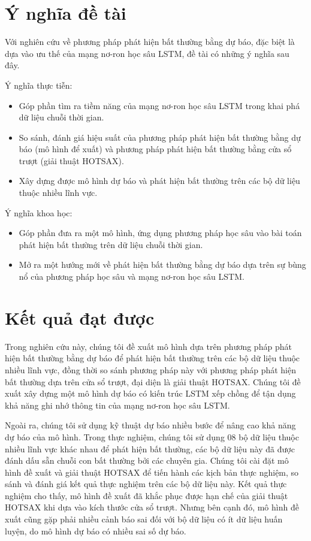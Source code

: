 \section{Ý nghĩa đề tài}
Với nghiên cứu về phương pháp phát hiện bất thường bằng dự báo, đặc biệt là dựa vào ưu thế của mạng nơ-ron học sâu LSTM, đề tài có những ý nghĩa sau đây.

Ý nghĩa thực tiễn:
\begin{itemize}
\item Góp phần tìm ra tiềm năng của mạng nơ-ron học sâu LSTM trong khai phá dữ liệu chuỗi thời gian.
\item So sánh, đánh giá hiệu suất của phương pháp phát hiện bất thường bằng dự báo (mô hình để xuất) và phương pháp phát hiện bất thường bằng cửa sổ trượt (giải thuật HOTSAX).
\item Xây dựng được mô hình dự báo và phát hiện bất thường trên các bộ dữ liệu thuộc nhiều lĩnh vực.
\end{itemize}

Ý nghĩa khoa học:
\begin{itemize}
\item Góp phần đưa ra một mô hình, ứng dụng phương pháp học sâu vào bài toán phát hiện bất thường trên dữ liệu chuỗi thời gian.
\item Mở ra một hướng mới về phát hiện bất thường bằng dự báo dựa trên sự bùng nổ của phương pháp học sâu và mạng nơ-ron học sâu LSTM.
\end{itemize}

\section{Kết quả đạt được}
Trong nghiên cứu này, chúng tôi đề xuất mô hình dựa trên phương pháp phát hiện bất thường bằng dự báo để phát hiện bất thường trên các bộ dữ liệu thuộc nhiều lĩnh vực, đồng thời so sánh phương pháp này với phương pháp phát hiện bất thường dựa trên cửa sổ trượt, đại diện là giải thuật HOTSAX. Chúng tôi đề xuất xây dựng một mô hình dự báo có kiến trúc LSTM xếp chồng để tận dụng khả năng ghi nhớ thông tin của mạng nơ-ron học sâu LSTM.

Ngoài ra, chúng tôi sử dụng kỹ thuật dự báo nhiều bước để nâng cao khả năng dự báo của mô hình. Trong thực nghiệm, chúng tôi sử dụng 08 bộ dữ liệu thuộc nhiều lĩnh vực khác nhau để phát hiện bất thường, các bộ dữ liệu này đã được đánh dấu sẵn chuỗi con bất thường bởi các chuyên gia. Chúng tôi cài đặt mô hình đề xuất và giải thuật HOTSAX để tiến hành các kịch bản thực nghiệm, so sánh và đánh giá kết quả thực nghiệm trên các bộ dữ liệu này. Kết quả thực nghiệm cho thấy, mô hình đề xuất đã khắc phục được hạn chế của giải thuật HOTSAX khi dựa vào kích thước cửa sổ trượt. Nhưng bên cạnh đó, mô hình đề xuất cũng gặp phải nhiều cảnh báo sai đối với bộ dữ liệu có ít dữ liệu huấn luyện, do mô hình dự báo có nhiều sai số dự báo.

